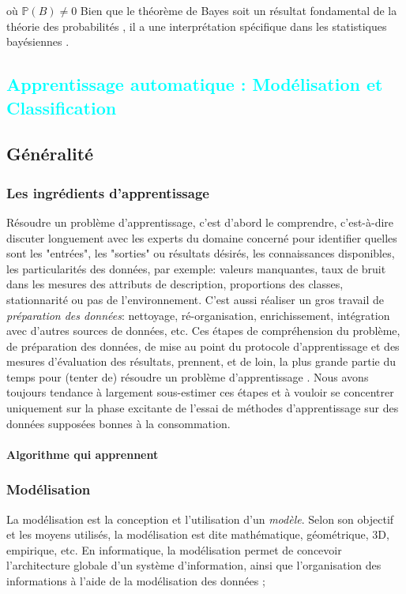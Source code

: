 		où $\mathbb{P}(B) \ne 0$ Bien que le théorème de Bayes soit un résultat fondamental de la théorie des probabilités , il a une interprétation spécifique dans les statistiques bayésiennes \cite[][]{antoine2018apprentissage}.

		
%
%


\textcolor{cyan}{\chapter{Apprentissage automatique : Modélisation et Classification }}
	\section{Généralité}
	\subsection{Les ingrédients d'apprentissage}
	Résoudre un problème d'apprentissage, c'est d'abord le comprendre, c'est-à-dire discuter longuement avec les experts du domaine concerné pour identifier quelles sont les "entrées", les  "sorties" ou résultats désirés, les connaissances disponibles, les particularités des données, par exemple: valeurs manquantes, taux de bruit dans les mesures des attributs de description, proportions des classes, stationnarité ou pas de l'environnement. 
	C'est aussi réaliser un gros travail de \textit{préparation des données}: nettoyage, ré-organisation, enrichissement, intégration avec d'autres sources de données, etc. Ces étapes de compréhension du problème, de préparation des données, de mise au point du protocole d'apprentissage et des mesures d'évaluation des résultats, prennent, et de loin, la plus grande partie du temps pour (tenter de) résoudre un problème d'apprentissage \cite{antoine2018apprentissage}. 
	Nous avons toujours tendance à largement sous-estimer ces étapes et à vouloir se concentrer uniquement sur la phase excitante de l'essai de méthodes d'apprentissage sur des données supposées bonnes à la consommation. 
	\subsubsection{Algorithme qui apprennent}
	
	
	\subsection{Modélisation}\label{sec:modelisation}
	La modélisation est la conception et l'utilisation d'un \textit{modèle}. Selon son objectif et les moyens utilisés, la modélisation est dite mathématique, géométrique, 3D, empirique, etc. 
	En informatique, la modélisation permet de concevoir l'architecture globale d'un système d'information, ainsi que l'organisation des informations à l'aide de la modélisation des données ;
	
